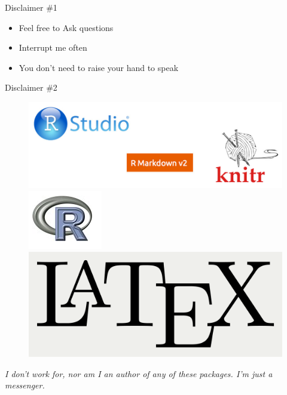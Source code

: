 \documentclass[10pt]{beamer}\usepackage[]{graphicx}\usepackage[]{color}
\begin{document}
\begin{frame}{Disclaimer \#1}
\begin{itemize}
\item Feel free to Ask questions
\item Interrupt me often
\item You don't need to raise your hand to speak
\end{itemize}
\end{frame}


\begin{frame}{Disclaimer \#2}
\begin{figure}
\includegraphics[width=1.0\columnwidth]{rstudio.png}\\[5mm]
\includegraphics[width=0.2\columnwidth]{rlogo.png}\\[5mm]
\includegraphics[width=0.2\columnwidth]{LaTeX_logo.png}
\end{figure}

\textit{I don't work for, nor am I an author of any of these packages. I'm just a messenger.}

\end{frame}
\end{document}
